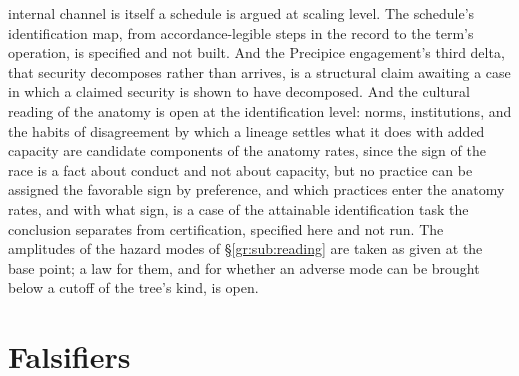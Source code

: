internal channel is itself a schedule is argued at scaling level. The
schedule's identification map, from accordance-legible steps in the
record to the term's operation, is specified and not built. And the
Precipice engagement's third delta, that security decomposes rather than
arrives, is a structural claim awaiting a case in which a claimed security
is shown to have decomposed. And the cultural reading of the anatomy is
open at the identification level: norms, institutions, and the habits
of disagreement by which a lineage settles what it does with added
capacity are candidate components of the anatomy rates, since the
sign of the race is a fact about conduct and not about capacity, but no
practice can be assigned the favorable sign by preference, and which
practices enter the anatomy rates, and with what sign, is a case of
the attainable identification task the conclusion separates from
certification, specified here and not run.
The amplitudes of the hazard modes of \S\ref{gr:sub:reading} are taken
as given at the base point; a law for them, and for whether an adverse
mode can be brought below a cutoff of the tree's kind, is open.

\section{Falsifiers}\label{sec:falsifiers}

